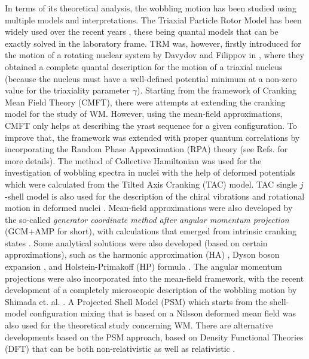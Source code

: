 \documentclass[11pt]{article}
\begin{document}
In terms of its theoretical analysis, the wobbling motion has been studied using multiple models and interpretations. The Triaxial Particle Rotor Model has been widely used over the recent years \cite{bohr1998nuclear,hamamoto2002wobbling,frauendorf2014transverse,tanabe2006algebraic,wen2015wobbling}, these being quantal models that can be exactly solved in the laboratory frame. TRM was, however, firstly introduced for the motion of a rotating nuclear system by Davydov and Filippov in \cite{davydov1958rotational}, where they obtained a complete quantal description for the motion of a triaxial nucleus (because the nucleus must have a well-defined potential minimum at a non-zero value for the triaxiality parameter $\gamma$). Starting from the framework of Cranking Mean Field Theory (CMFT), there were attempts at extending the cranking model for the study of WM. However, using the mean-field approximations, CMFT only helps at describing the yrast sequence for a given configuration. To improve that, the framework was extended with proper quantum correlations by incorporating the Random Phase Approximation (RPA) theory (see Refs. \cite{shimizu1995nuclear,matsuzaki2002wobbling,matsuzaki2003dynamical,matsuzaki2004instability,matsuzaki2004nuclear,shimizu2005high,shimizu2008parametrizations,shoji2009microscopic} for more details).  The method of Collective Hamiltonian \cite{chen2014collective,chen2016wobbling} was used for the investigation of wobbling spectra in nuclei with the help of deformed potentials which were calculated from the Tilted Axis Cranking (TAC) model. TAC single $j$-shell model is also used for the description of the chiral vibrations and rotational motion in deformed nuclei \cite{mukhopadhyay2007chiral,qi2009chirality}. Mean-field approximations were also developed by the so-called \emph{generator coordinate method after angular momentum projection} (GCM+AMP for short), with calculations that emerged from intrinsic cranking states \cite{oi2000wobbling}. Some analytical solutions were also developed (based on certain approximations), such as the harmonic approximation (HA) \cite{bohr1998nuclear,frauendorf2014transverse,chen2014collective,raduta2017semiclassical}, Dyson boson expansion \cite{raduta2017semiclassical,raduta2020new}, and Holstein-Primakoff (HP) formula \cite{tanabe1971triaxiality,tanabe2006algebraic,tanabe2008selection,raduta2017semiclassical,raduta2020new}. The angular momentum projections were also incorporated into the mean-field framework, with the recent development of a completely microscopic description of the wobbling motion by Shimada et. al. \cite{shimada2018rotational}. A Projected Shell Model (PSM) \cite{hara1995projected} which starts from the shell-model configuration mixing that is based on a Nilsson deformed mean field was also used for the theoretical study concerning WM. There are alternative developments based on the PSM approach, based on Density Functional Theories (DFT) that can be both non-relativistic \cite{zhao2016configuration} as well as relativistic \cite{konieczka2018gamow}.
\end{document}
